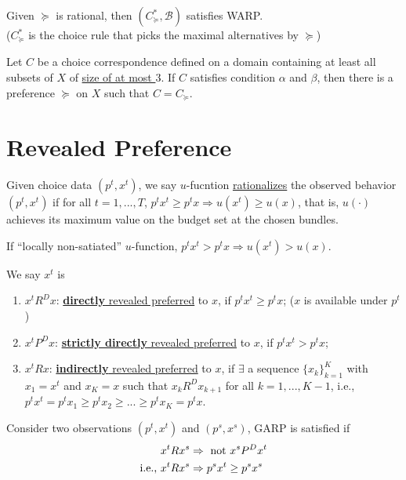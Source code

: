 \documentclass[11pt]{elegantbook}
\begin{document}
\begin{proposition}
    Given $\succeq$ is rational, then $(C^*_{\succeq},\mathcal{B})$ satisfies WARP.\\
    ($C^*_{\succeq}$ is the choice rule that picks the maximal alternatives by $\succeq$)
\end{proposition}

\begin{proposition}
    Let $C$ be a choice correspondence defined on a domain containing at least all subsets of $X$ of \underline{size of at most $3$}. If $C$ satisfies condition $\alpha$ and $\beta$, then there is a preference $\succeq$ on $X$ such that $C=C_\succeq$.
\end{proposition}

\section{Revealed Preference}
Given choice data $(p^t,x^t)$, we say $u$-fucntion \underline{rationalizes} the observed behavior $(p^t,x^t)$ if for all $t=1,...,T$, $p^t x^t\geq p^t x \Rightarrow u(x^t)\geq u(x)$, that is, $u(\cdot)$ achieves its maximum value on the budget set at the chosen bundles.

If ``locally non-satiated'' $u$-function, $p^t x^t> p^t x \Rightarrow u(x^t)> u(x)$.

\begin{definition}
    \normalfont
    We say $x^t$ is
    \begin{enumerate}[-]
        \item $x^t R^D x$: \underline{\textbf{directly} revealed preferred} to $x$, if $p^t x^t \geq p^t x$; ($x$ is available under $p^t$)
        \item $x^t P^D x$: \underline{\textbf{strictly directly} revealed preferred} to $x$, if $p^t x^t > p^t x$;
        \item $x^t R x$: \underline{\textbf{indirectly} revealed preferred} to $x$, if $\exists$ a sequence $\{x_k\}_{k=1}^K$ with $x_1=x^t$ and $x_K=x$ such that $x_k R^D x_{k+1}$ for all $k=1,...,K-1$, i.e., $p^t x^t=p^t x_1\geq p^t x_2\geq ... \geq p^t x_K=p^t x$.
    \end{enumerate}
\end{definition}

\begin{definition}
    \normalfont
    Consider two observations $(p^t,x^t)$ and $(p^s,x^s)$, GARP is satisfied if
    \begin{equation}
        \begin{aligned}
            x^t R x^s &\Rightarrow \textnormal{ not } x^s P^D x^t\\
            \textnormal{i.e., }x^t R x^s &\Rightarrow p^s x^t\geq p^s x^s
        \end{aligned}
        \nonumber
    \end{equation}
\end{definition}
\end{document}
